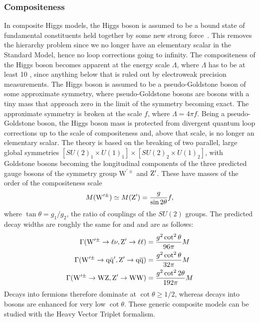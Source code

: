 \subsubsection{Compositeness}
In composite Higgs models, the Higgs boson is assumed to be a bound state of fundamental constituents held together by some new strong force~\cite{Bellazzini:2014yua,Contino:2011np}. This removes the hierarchy problem since we no longer have an elementary scalar in the Standard Model, hence no loop corrections going to infinity. The compositeness of the Higgs boson becomes apparent at the energy scale $\Lambda$, where $\Lambda$ has to be at least 10 \TeV, since anything below that is ruled out by electroweak precision measurements.
The Higgs boson is assumed to be a pseudo-Goldstone boson of some approximate symmetry, where pseudo-Goldstone bosons are bosons with a tiny mass that approach zero in the limit of the symmetry becoming exact. The approximate symmetry is broken at the scale $f$, where $\Lambda=4\pi f$. Being a pseudo-Goldstone boson, the Higgs boson mass is protected from divergent quantum loop corrections up to the scale of compositeness and, above that scale, is no longer an elementary scalar.
The theory is based on the breaking of two parallel, large global symmetries $[SU(2)_1 \times U(1)_1]\times[SU(2)_2 \times U(1)_2]$, with Goldstone bosons becoming the longitudinal components of the three predicted gauge bosons of the symmetry group $\mathrm{W}^{\prime\pm}$ and $\mathrm{Z}^\prime$. These have masses of the order of the compositeness scale
\begin{equation}\label{eqn:LHvprimeMass}
M(\mathrm{W}^{\prime\pm}) \simeq M(\mathrm{Z}^\prime) = \frac{g}{\sin2\theta}f,
\end{equation}
\noindent where $\tan\theta = g_1/g_2$, the ratio of couplings of the $SU(2)$ groups. The predicted decay widths are roughly the same for \PZpr and \PWpr and are as follows:
\begin{equation}
\begin{aligned}
\Gamma(\mathrm{W}^{\prime\pm} \to \ell\nu, \mathrm{Z}^\prime \to \ell\ell) & = \frac{g^2\cot^2\theta}{96\pi}M\\
\Gamma(\mathrm{W}^{\prime\pm} \to \mathrm{q}\bar{\mathrm{q}}^\prime,\mathrm{Z}^\prime \to \mathrm{q}\overline{\mathrm{q}}) & = \frac{g^2\cot^2\theta}{32\pi}M\\
\Gamma(\mathrm{W}^{\prime\pm} \to \mathrm{W}\mathrm{Z},\mathrm{Z}^\prime \to \mathrm{W}\mathrm{W}) & = \frac{g^2\cot^22\theta}{192\pi}M
\end{aligned} 
\end{equation}
Decays into fermions therefore dominate at $\cot\theta \geq 1/2$, whereas decays into bosons are enhanced for very low $\cot\theta$.\newline
These generic composite models can be studied with the Heavy Vector Triplet formalism.

